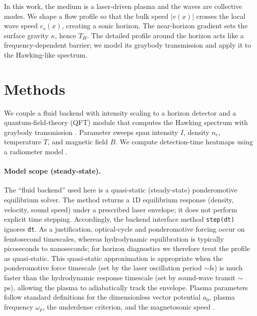 \documentclass[11pt]{article}
\begin{document}
In this work, the medium is a laser-driven plasma and the waves are collective modes. We shape a flow profile so that the bulk speed $|v(x)|$ crosses the local wave speed $c_s(x)$, creating a sonic horizon. The near-horizon gradient sets the surface gravity $\kappa$, hence $T_H$. The detailed profile around the horizon acts like a frequency-dependent barrier; we model its graybody transmission and apply it to the Hawking-like spectrum.

\section{Methods}
We couple a fluid backend with intensity scaling to a horizon detector and a quantum-field-theory (QFT) module that computes the Hawking spectrum with graybody transmission \cite{Planck1901,Page1976}. Parameter sweeps span intensity $I$, density $n_e$, temperature $T$, and magnetic field $B$. We compute detection-time heatmaps using a radiometer model \cite{Wilson2013}.
\paragraph{Model scope (steady-state).} The ``fluid backend'' used here is a quasi-static (steady-state) ponderomotive equilibrium solver. The method returns a 1D equilibrium response (density, velocity, sound speed) under a prescribed laser envelope; it does not perform explicit time stepping. Accordingly, the backend interface method \texttt{step(dt)} ignores \texttt{dt}. As a justification, optical-cycle and ponderomotive forcing occur on femtosecond timescales, whereas hydrodynamic equilibration is typically picoseconds to nanoseconds; for horizon diagnostics we therefore treat the profile as quasi-static.
 This quasi-static approximation is appropriate when the ponderomotive force timescale (set by the laser oscillation period $\sim$fs) is much faster than the hydrodynamic response timescale (set by sound-wave transit $\sim$ps), allowing the plasma to adiabatically track the envelope.
Plasma parameters follow standard definitions for the dimensionless vector potential $a_0$, plasma frequency $\omega_p$, the underdense criterion, and the magnetosonic speed \cite{Esarey2009,Chen2016}.
\end{document}
